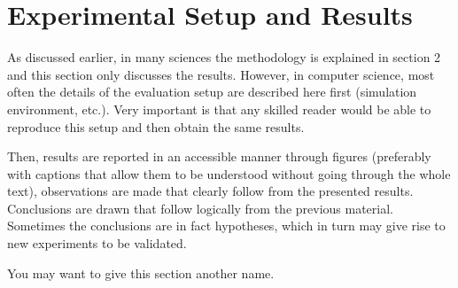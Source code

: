 \section{Experimental Setup and Results}
As discussed earlier, in many sciences the methodology is explained in section 2 and this section only discusses the results. 
However, in computer science, most often the details of the evaluation setup are described here first (simulation environment, etc.).
Very important is that any skilled reader would be able to reproduce this setup and then obtain the same results.

Then, results are reported in an accessible manner through figures (preferably with captions that allow them to be understood without going through the whole text), observations are made that clearly follow from the presented results.
Conclusions are drawn that follow logically from the previous material.
Sometimes the conclusions are in fact hypotheses, which in turn may give rise to new experiments to be validated.

You may want to give this section another name.